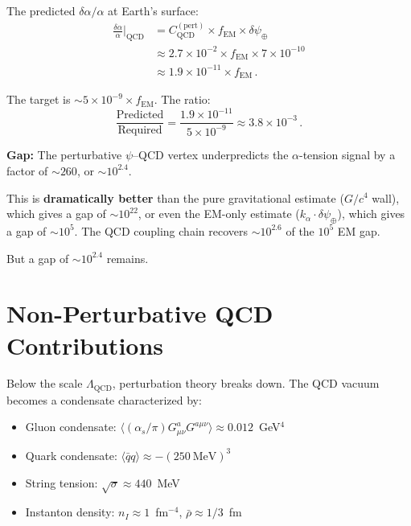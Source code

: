 \documentclass[aps,prd,twocolumn,superscriptaddress,floatfix,nofootinbib]{revtex4-2}
\newcommand{\LQCD}{\Lambda_{\mathrm{QCD}}}
\newcommand{\as}{\alpha_s}
\newcommand{\fEM}{f_{\mathrm{EM}}}
\newcommand{\ka}{k_\alpha}
\newcommand{\dpsi}{\delta\psi}
\newcommand{\dalpha}{\delta\alpha}
\newcommand{\alphafine}{\alpha}
\begin{document}
The predicted $\delta\alphafine/\alphafine$ at Earth's surface:
\begin{align}
\frac{\dalpha}{\alphafine}\bigg|_{\mathrm{QCD}}
&= C_{\mathrm{QCD}}^{(\mathrm{pert})} \times \fEM \times \dpsi_\oplus
\nonumber \\
&\approx 2.7 \times 10^{-2} \times \fEM \times 7 \times 10^{-10}
\nonumber \\
&\approx 1.9 \times 10^{-11} \times \fEM \, .
\label{eq:dalpha_QCD}
\end{align}

The target is $\sim 5 \times 10^{-9} \times \fEM$. The ratio:
\begin{equation}
\frac{\text{Predicted}}{\text{Required}} = \frac{1.9 \times 10^{-11}}{5 \times 10^{-9}}
\approx 3.8 \times 10^{-3} \, .
\label{eq:gap_ratio}
\end{equation}

\begin{tcolorbox}[colback=red!5!white, colframe=red!60!black,
  title=The Magnitude Gap (Perturbative)]
\textbf{Gap:} The perturbative $\psi$--QCD vertex underpredicts the
$\alpha$-tension signal by a factor of $\sim 260$, or $\sim 10^{2.4}$.

This is \textbf{dramatically better} than the pure gravitational estimate
($G/c^4$ wall), which gives a gap of $\sim 10^{22}$, or even the
EM-only estimate ($\ka \cdot \dpsi_\oplus$), which gives a gap of
$\sim 10^{5}$. The QCD coupling chain recovers $\sim 10^{2.6}$ of the
$10^{5}$ EM gap.

But a gap of $\sim 10^{2.4}$ remains.
\end{tcolorbox}


\section{Non-Perturbative QCD Contributions}\label{sec:nonpert}

Below the scale $\LQCD$, perturbation theory breaks down. The QCD vacuum
becomes a condensate characterized by:
\begin{itemize}
\item Gluon condensate:
$\langle (\as/\pi) G^a_{\mu\nu} G^{a\mu\nu} \rangle \approx
0.012$~GeV$^4$
\item Quark condensate: $\langle \bar{q}q \rangle \approx -(250~\text{MeV})^3$
\item String tension: $\sqrt{\sigma} \approx 440$~MeV
\item Instanton density: $n_I \approx 1$~fm$^{-4}$, $\bar{\rho} \approx
1/3$~fm
\end{itemize}
\end{document}
